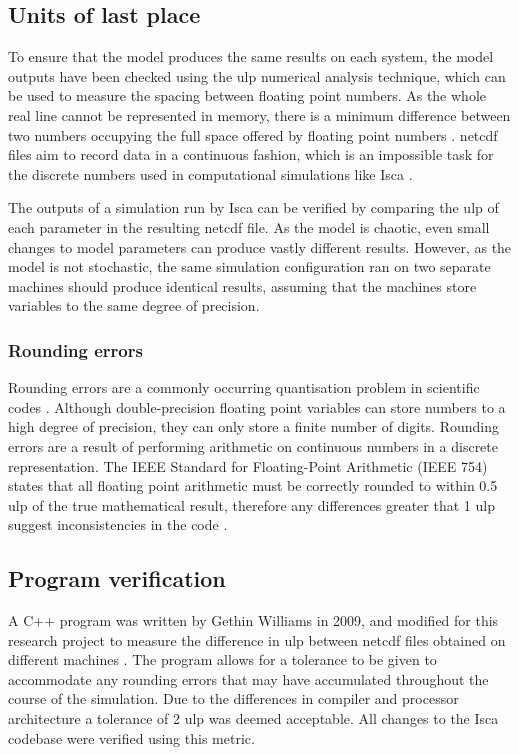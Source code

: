 \documentclass[a4paper,11pt]{report}
\begin{document}
\subsection{Units of last place}
To ensure that the model produces the same results on each system, the model outputs have been checked using the \gls{ulp} numerical analysis technique, which can be used to measure the spacing between floating point numbers. As the whole real line cannot be represented in memory, there is a minimum difference between two numbers occupying the full space offered by floating point numbers \cite{goldberg1991every}. \gls{netcdf} files aim to record data in a continuous fashion, which is an impossible task for the discrete numbers used in computational simulations like Isca \cite{rew1990netcdf}.
\par
The outputs of a simulation run by Isca can be verified by comparing the \gls{ulp} of each parameter in the resulting \gls{netcdf} file. As the model is chaotic, even small changes to model parameters can produce vastly different results. However, as the model is not stochastic, the same simulation configuration ran on two separate machines should produce identical results, assuming that the machines store variables to the same degree of precision. 

\subsubsection{Rounding errors}
Rounding errors are a commonly occurring quantisation problem in scientific codes \cite{goldberg1991every}. Although double-precision floating point variables can store numbers to a high degree of precision, they can only store a finite number of digits. Rounding errors are a result of performing arithmetic on continuous numbers in a discrete representation. The IEEE Standard for Floating-Point Arithmetic (IEEE 754) states that all floating point arithmetic must be correctly rounded to within 0.5 \gls{ulp} of the true mathematical result, therefore any differences greater that 1 \gls{ulp} suggest inconsistencies in the code \cite{goldberg1991every,ieee1985ieee}. 

\subsection{Program verification}
A C++ program was written by Gethin Williams in 2009, and modified for this research project to measure the difference in \gls{ulp} between \gls{netcdf} files obtained on different machines \cite{puma2018}. The program allows for a tolerance to be given to accommodate any rounding errors that may have accumulated throughout the course of the simulation. Due to the differences in compiler and processor architecture a tolerance of 2 \gls{ulp} was deemed acceptable. All changes to the Isca codebase were verified using this metric.
\end{document}
